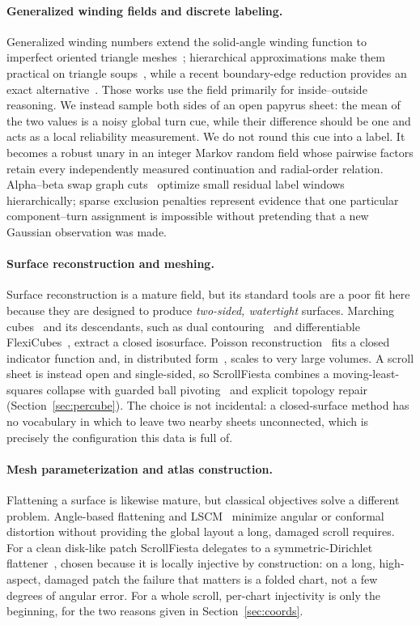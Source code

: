 \paragraph{Generalized winding fields and discrete labeling.} Generalized winding numbers extend the solid-angle winding function to imperfect oriented triangle meshes~\cite{jacobson2013winding}; hierarchical approximations make them practical on triangle soups~\cite{barill2018fast}, while a recent boundary-edge reduction provides an exact alternative~\cite{xie2026fast}. Those works use the field primarily for inside--outside reasoning. We instead sample both sides of an open papyrus sheet: the mean of the two values is a noisy global turn cue, while their difference should be one and acts as a local reliability measurement. We do not round this cue into a label. It becomes a robust unary in an integer Markov random field whose pairwise factors retain every independently measured continuation and radial-order relation. Alpha--beta swap graph cuts~\cite{boykov2001fast} optimize small residual label windows hierarchically; sparse exclusion penalties represent evidence that one particular component--turn assignment is impossible without pretending that a new Gaussian observation was made.

\paragraph{Surface reconstruction and meshing.} Surface reconstruction is a mature field, but its standard tools are a poor fit here because they are designed to produce \emph{two-sided, watertight} surfaces. Marching cubes~\cite{lorensen1998marching} and its descendants, such as dual contouring~\cite{ju2002dual} and differentiable FlexiCubes~\cite{shen2023flexicubes}, extract a closed isosurface. Poisson reconstruction~\cite{kazhdan2006poisson} fits a closed indicator function and, in distributed form~\cite{kazhdan2023distributed}, scales to very large volumes. A scroll sheet is instead open and single-sided, so ScrollFiesta combines a moving-least-squares collapse with guarded ball pivoting~\cite{bernardini1999ball} and explicit topology repair (Section~\ref{sec:percube}). The choice is not incidental: a closed-surface method has no vocabulary in which to leave two nearby sheets unconnected, which is precisely the configuration this data is full of.

\paragraph{Mesh parameterization and atlas construction.} Flattening a surface is likewise mature, but classical objectives solve a different problem. Angle-based flattening and LSCM~\cite{sheffer2005abf++} minimize angular or conformal distortion without providing the global layout a long, damaged scroll requires. For a clean disk-like patch ScrollFiesta delegates to a symmetric-Dirichlet flattener~\cite{smith2015bijective}, chosen because it is locally injective by construction: on a long, high-aspect, damaged patch the failure that matters is a folded chart, not a few degrees of angular error. For a whole scroll, per-chart injectivity is only the beginning, for the two reasons given in Section~\ref{sec:coords}.

